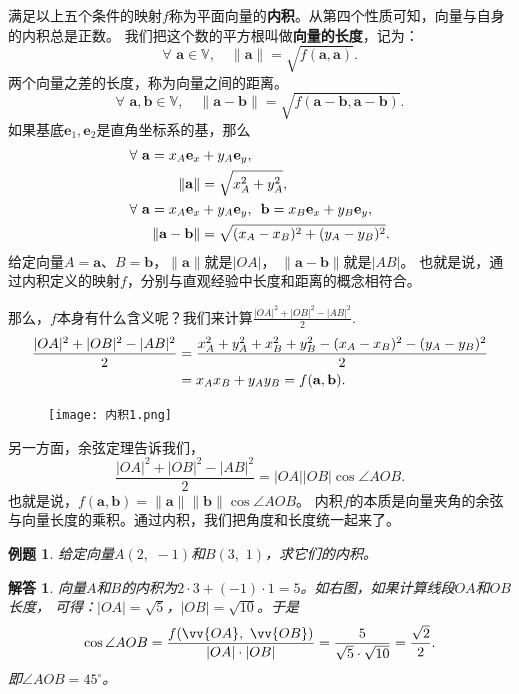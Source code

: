 \documentclass[12pt,UTF8]{ctexbook}
\newtheorem{et}{例题}[section]
\newtheorem*{so}{解答}
\begin{document}
满足以上五个条件的映射$f$称为平面向量的\textbf{内积}。从第四个性质可知，向量与自身的内积总是正数。
我们把这个数的平方根叫做\textbf{向量的长度}，记为：
$$ \forall \,\, \mathbf{a} \in \mathbb{V}, \quad \| \mathbf{a}\| = \sqrt{f(\mathbf{a}, \mathbf{a})}. $$
两个向量之差的长度，称为向量之间的距离。
$$ \forall \,\, \mathbf{a}, \mathbf{b} \in \mathbb{V}, \quad \| \mathbf{a} - \mathbf{b}\| = \sqrt{f(\mathbf{a} - \mathbf{b}, \mathbf{a} - \mathbf{b})}. $$
如果基底$\mathbf{e}_1, \mathbf{e}_2$是直角坐标系的基，那么
\begin{align}
    \forall \,\, \mathbf{a} = x_A\mathbf{e}_x &+ y_A\mathbf{e}_y , \notag \\
    \| \mathbf{a}\| &= \sqrt{x_A^2 + y_A^2}, \notag \\
    \forall \,\, \mathbf{a} = x_A\mathbf{e}_x &+ y_A\mathbf{e}_y,\,\,\, \mathbf{b} = x_B\mathbf{e}_x + y_B\mathbf{e}_y , \notag \\
    \| \mathbf{a} - \mathbf{b}\| &= \sqrt{(x_A - x_B)^2 + (y_A - y_B)^2}. \notag
\end{align}
给定向量$A = \mathbf{a}$、$B =\mathbf{b}$，$\| \mathbf{a} \|$就是$|OA|$，
$\|\mathbf{a} - \mathbf{b}\|$就是$|AB|$。
也就是说，通过内积定义的映射$f$，分别与直观经验中长度和距离的概念相符合。

那么，$f$本身有什么含义呢？我们来计算$ \frac{|OA|^2 + |OB|^2 - |AB|^2}{2}.$
\begin{align}
    \frac{|OA|^2 + |OB|^2 - |AB|^2}{2} &= \frac{x_A^2 + y_A^2 + x_B^2 + y_B^2 - (x_A - x_B)^2 - (y_A - y_B)^2}{2} \notag \\
    &= x_Ax_B + y_Ay_B = f(\mathbf{a}, \mathbf{b}). \notag 
\end{align}

\begin{figure} 
    \vspace{-16pt}
    \flushright
    \texttt{[image: 内积1.png]}
\end{figure}

另一方面，余弦定理告诉我们，
$$ \frac{|OA|^2 + |OB|^2 - |AB|^2}{2} = |OA||OB|\cos \angle AOB.$$
也就是说，$f(\mathbf{a}, \mathbf{b}) = \|\mathbf{a}\| \|\mathbf{b}\| \cos \angle AOB$。%
内积$f$的本质是向量夹角的余弦与向量长度的乘积。通过内积，我们把角度和长度统一起来了。

\begin{et}
    给定向量$A(2,\,\, -1)$和$B(3,\,\, 1)$，求它们的内积。
\end{et}
\begin{so}
    向量$A$和$B$的内积为$2\cdot 3 + (-1)\cdot 1 = 5$。如右图，如果计算线段$OA$和$OB$长度，
    可得：$|OA| = \sqrt{5}$，$|OB| = \sqrt{10}$。于是
    $$\cos{\angle AOB} = \frac{f(\vv{OA},\,\,\vv{OB})}{|OA|\cdot|OB|} = \frac{5}{\sqrt{5}\cdot\sqrt{10}} = \frac{\sqrt{2}}{2}. $$
    即$\angle AOB = 45^\circ$。
\end{so}
\end{document}

